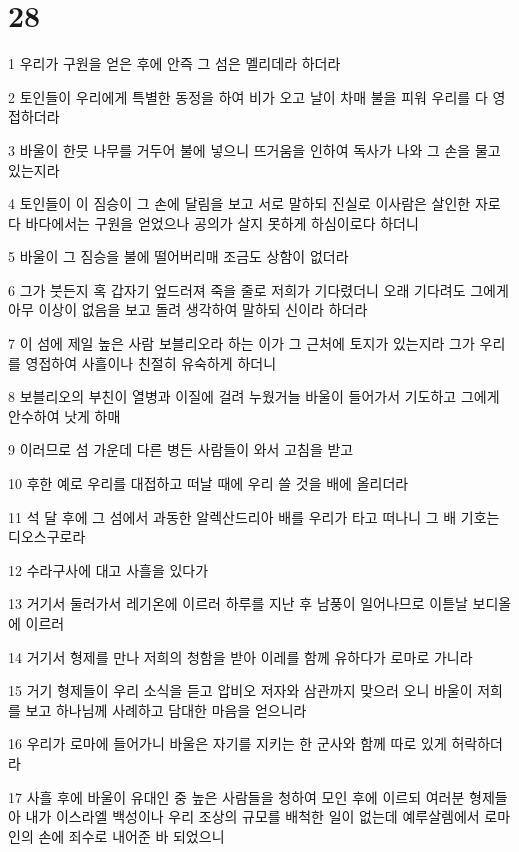 \chapter{28}

\par 1 우리가 구원을 얻은 후에 안즉 그 섬은 멜리데라 하더라
\par 2 토인들이 우리에게 특별한 동정을 하여 비가 오고 날이 차매 불을 피워 우리를 다 영접하더라
\par 3 바울이 한뭇 나무를 거두어 불에 넣으니 뜨거움을 인하여 독사가 나와 그 손을 물고 있는지라
\par 4 토인들이 이 짐승이 그 손에 달림을 보고 서로 말하되 진실로 이사람은 살인한 자로다 바다에서는 구원을 얻었으나 공의가 살지 못하게 하심이로다 하더니
\par 5 바울이 그 짐승을 불에 떨어버리매 조금도 상함이 없더라
\par 6 그가 붓든지 혹 갑자기 엎드러져 죽을 줄로 저희가 기다렸더니 오래 기다려도 그에게 아무 이상이 없음을 보고 돌려 생각하여 말하되 신이라 하더라
\par 7 이 섬에 제일 높은 사람 보블리오라 하는 이가 그 근처에 토지가 있는지라 그가 우리를 영접하여 사흘이나 친절히 유숙하게 하더니
\par 8 보블리오의 부친이 열병과 이질에 걸려 누웠거늘 바울이 들어가서 기도하고 그에게 안수하여 낫게 하매
\par 9 이러므로 섬 가운데 다른 병든 사람들이 와서 고침을 받고
\par 10 후한 예로 우리를 대접하고 떠날 때에 우리 쓸 것을 배에 올리더라
\par 11 석 달 후에 그 섬에서 과동한 알렉산드리아 배를 우리가 타고 떠나니 그 배 기호는 디오스구로라
\par 12 수라구사에 대고 사흘을 있다가
\par 13 거기서 둘러가서 레기온에 이르러 하루를 지난 후 남풍이 일어나므로 이튿날 보디올에 이르러
\par 14 거기서 형제를 만나 저희의 청함을 받아 이레를 함께 유하다가 로마로 가니라
\par 15 거기 형제들이 우리 소식을 듣고 압비오 저자와 삼관까지 맞으러 오니 바울이 저희를 보고 하나님께 사례하고 담대한 마음을 얻으니라
\par 16 우리가 로마에 들어가니 바울은 자기를 지키는 한 군사와 함께 따로 있게 허락하더라
\par 17 사흘 후에 바울이 유대인 중 높은 사람들을 청하여 모인 후에 이르되 여러분 형제들아 내가 이스라엘 백성이나 우리 조상의 규모를 배척한 일이 없는데 예루살렘에서 로마인의 손에 죄수로 내어준 바 되었으니
